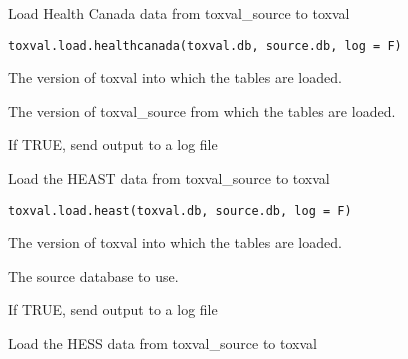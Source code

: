 \documentclass[letterpaper]{book}
\begin{document}
%
\begin{Description}\relax
Load Health Canada data from toxval\_source to toxval
\end{Description}
%
\begin{Usage}
\begin{verbatim}
toxval.load.healthcanada(toxval.db, source.db, log = F)
\end{verbatim}
\end{Usage}
%
\begin{Arguments}
\begin{ldescription}
\item[\code{toxval.db}] The version of toxval into which the tables are loaded.

\item[\code{source.db}] The version of toxval\_source from which the tables are loaded.

\item[\code{log}] If TRUE, send output to a log file
\end{ldescription}
\end{Arguments}
%
\begin{Description}\relax
Load the HEAST data from toxval\_source to toxval
\end{Description}
%
\begin{Usage}
\begin{verbatim}
toxval.load.heast(toxval.db, source.db, log = F)
\end{verbatim}
\end{Usage}
%
\begin{Arguments}
\begin{ldescription}
\item[\code{toxval.db}] The version of toxval into which the tables are loaded.

\item[\code{source.db}] The source database to use.

\item[\code{log}] If TRUE, send output to a log file
\end{ldescription}
\end{Arguments}
%
\begin{Description}\relax
Load the HESS data from toxval\_source to toxval
\end{Description}
\end{document}
